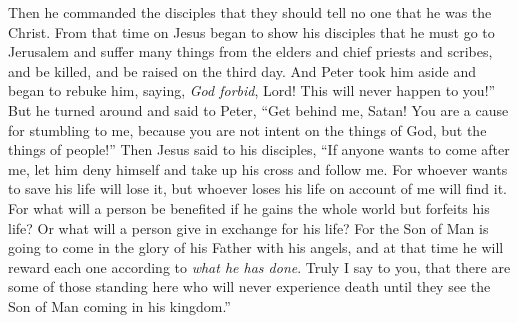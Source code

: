\begin{biblechapter}
\verse Then he commanded the disciples that they should tell no one that he was the Christ.
 From that time on Jesus began to show his disciples that he must go to Jerusalem and suffer many things from the elders and chief priests and scribes, and be killed, and be raised on the third day.
\verse And Peter took him aside and began to rebuke him, saying, \textit{God forbid}, Lord! This will never happen to you!”
\verse But he turned around and said to Peter, “Get behind me, Satan! You are a cause for stumbling to me, because you are not intent on the things of God, but the things of people!”
 Then Jesus said to his disciples, “If anyone wants to come after me, let him deny himself and take up his cross and follow me.
\verse For whoever wants to save his life will lose it, but whoever loses his life on account of me will find it.
\verse For what will a person be benefited if he gains the whole world but forfeits his life? Or what will a person give in exchange for his life?
\verse For the Son of Man is going to come in the glory of his Father with his angels, and at that time he will reward each one according to \textit{what he has done}.
\verse Truly I say to you, that there are some of those standing here who will never experience death until they see the Son of Man coming in his kingdom.”
\end{biblechapter}

